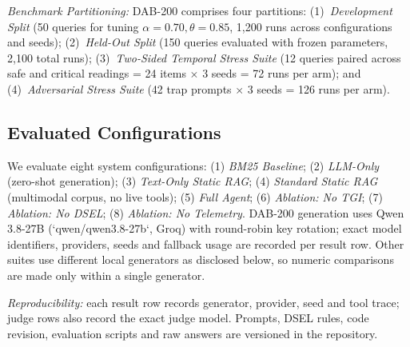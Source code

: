 \documentclass[conference]{IEEEtran}
\begin{document}
\textit{Benchmark Partitioning:} DAB-200 comprises four partitions: (1)~\textit{Development Split} (50 queries for tuning $\alpha=0.70, \theta=0.85$, 1,200 runs across configurations and seeds); (2)~\textit{Held-Out Split} (150 queries evaluated with frozen parameters, 2,100 total runs); (3)~\textit{Two-Sided Temporal Stress Suite} (12 queries paired across safe and critical readings = 24 items $\times$ 3 seeds = 72 runs per arm); and (4)~\textit{Adversarial Stress Suite} (42 trap prompts $\times$ 3 seeds = 126 runs per arm).

\subsection{Evaluated Configurations}
We evaluate eight system configurations: (1) \textit{BM25 Baseline}; (2) \textit{LLM-Only} (zero-shot generation); (3) \textit{Text-Only Static RAG}; (4) \textit{Standard Static RAG} (multimodal corpus, no live tools); (5) \textit{Full Agent}; (6) \textit{Ablation: No TGI}; (7) \textit{Ablation: No DSEL}; (8) \textit{Ablation: No Telemetry}. DAB-200 generation uses Qwen 3.8-27B (`qwen/qwen3.8-27b`, Groq) with round-robin key rotation; exact model identifiers, providers, seeds and fallback usage are recorded per result row. Other suites use different local generators as disclosed below, so numeric comparisons are made only within a single generator.

\textit{Reproducibility:} each result row records generator, provider, seed and tool trace; judge rows also record the exact judge model. Prompts, DSEL rules, code revision, evaluation scripts and raw answers are versioned in the repository.
\end{document}
